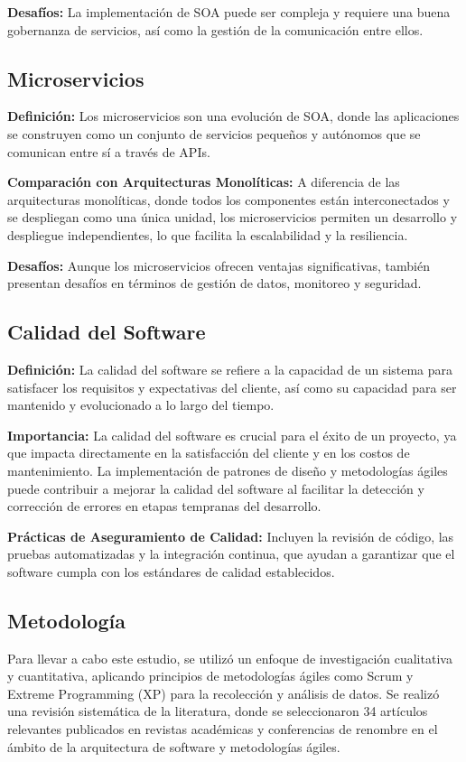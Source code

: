 \documentclass[twocolumn]{article}
\begin{document}
\textbf{Desafíos:} La implementación de SOA puede ser compleja y requiere una buena gobernanza de servicios, así como la gestión de la comunicación entre ellos.

\subsection{Microservicios}
\textbf{Definición:} Los microservicios son una evolución de SOA, donde las aplicaciones se construyen como un conjunto de servicios pequeños y autónomos que se comunican entre sí a través de APIs.

\textbf{Comparación con Arquitecturas Monolíticas:} A diferencia de las arquitecturas monolíticas, donde todos los componentes están interconectados y se despliegan como una única unidad, los microservicios permiten un desarrollo y despliegue independientes, lo que facilita la escalabilidad y la resiliencia.

\textbf{Desafíos:} Aunque los microservicios ofrecen ventajas significativas, también presentan desafíos en términos de gestión de datos, monitoreo y seguridad.

\subsection{Calidad del Software}
\textbf{Definición:} La calidad del software se refiere a la capacidad de un sistema para satisfacer los requisitos y expectativas del cliente, así como su capacidad para ser mantenido y evolucionado a lo largo del tiempo.

\textbf{Importancia:} La calidad del software es crucial para el éxito de un proyecto, ya que impacta directamente en la satisfacción del cliente y en los costos de mantenimiento. La implementación de patrones de diseño y metodologías ágiles puede contribuir a mejorar la calidad del software al facilitar la detección y corrección de errores en etapas tempranas del desarrollo.

\textbf{Prácticas de Aseguramiento de Calidad:} Incluyen la revisión de código, las pruebas automatizadas y la integración continua, que ayudan a garantizar que el software cumpla con los estándares de calidad establecidos.

\subsection{Metodología}
Para llevar a cabo este estudio, se utilizó un enfoque de investigación cualitativa y cuantitativa, aplicando principios de metodologías ágiles como Scrum y Extreme Programming (XP) para la recolección y análisis de datos. Se realizó una revisión sistemática de la literatura, donde se seleccionaron 34 artículos relevantes publicados en revistas académicas y conferencias de renombre en el ámbito de la arquitectura de software y metodologías ágiles.
\end{document}
